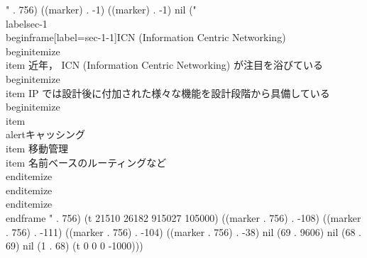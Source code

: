 " . 756) ((marker) . -1) ((marker) . -1) nil ("\\label{sec-1}
\\begin{frame}[label=sec-1-1]{ICN (Information Centric Networking)}
\\begin{itemize}
\\item 近年， ICN (Information Centric Networking) が注目を浴びている
\\begin{itemize}
\\item IP では設計後に付加された様々な機能を設計段階から具備している
\\begin{itemize}
\\item \\alert{キャッシング}
\\item 移動管理
\\item 名前ベースのルーティングなど
\\end{itemize}
\\end{itemize}
\\end{itemize}
\\end{frame}
" . 756) (t 21510 26182 915027 105000) ((marker . 756) . -108) ((marker . 756) . -111) ((marker . 756) . -104) ((marker . 756) . -38) nil (69 . 9606) nil (68 . 69) nil (1 . 68) (t 0 0 0 -1000)))
